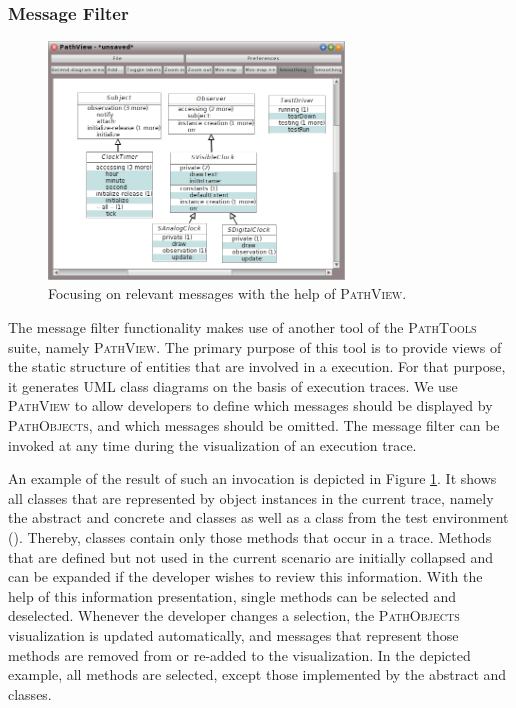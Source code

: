 \subsubsection{Message Filter}

\begin{figure}[tb]
	\centering
	\includegraphics[width=0.7\textwidth]{../images/04-ImplMessageFilter}
	\caption{Focusing on relevant messages with the help of \textsc{PathView}.}
	\label{fig:ImplementationFocusingMessages}
\end{figure}

The message filter functionality makes use of another tool of the \textsc{PathTools} suite, namely \textsc{PathView}.
The primary purpose of this tool is to provide views of the static structure of entities that are involved in a execution.
For that purpose, it generates UML class diagrams on the basis of execution traces.
We use \textsc{PathView} to allow developers to define which messages should be displayed by \textsc{PathObjects}, and which messages should be omitted.
The message filter can be invoked at any time during the visualization of an execution trace.

An example of the result of such an invocation is depicted in Figure \ref{fig:ImplementationFocusingMessages}.
It shows all classes that are represented by object instances in the current trace, namely the abstract and concrete  and  classes as well as a class from the test environment ().
Thereby, classes contain only those methods that occur in a trace.
Methods that are defined but not used in the current scenario are initially collapsed and can be expanded if the developer wishes to review this information.
With the help of this information presentation, single methods can be selected and deselected.
Whenever the developer changes a selection, the \textsc{PathObjects} visualization is updated automatically, and messages that represent those methods are removed from or re-added to the visualization.
In the depicted example, all methods are selected, except those implemented by the abstract  and  classes.

